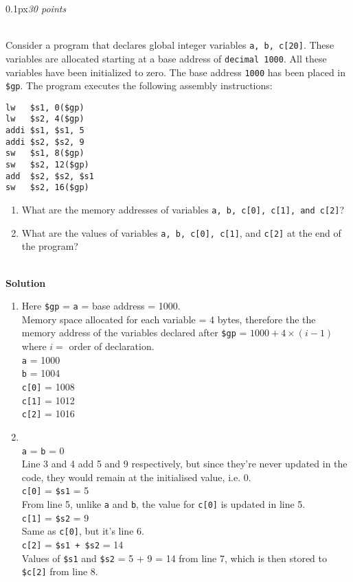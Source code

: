 \documentclass[11pt]{article}
\newcommand{\problem}[2]{\begin{adjustwidth}{0.1px}\noindent \framebox[1.2\width]{\large Problem #1}\hfill \emph{#2} \end{adjustwidth} \bigskip\\}
\newcommand{\code}[1]{{\texttt{#1}}}
\begin{document}
\newpage
\problem{9}{30 points}
Consider a program that declares global integer variables \code{a, b, c[20]}. These variables are allocated starting at a base address of \code{decimal 1000}. All these variables have been initialized to zero. The base address \code{1000} has been placed in \code{\$gp}. The program executes the following assembly instructions:
\begin{lstlisting}[style=MIPS]
lw   $s1, 0($gp)
lw   $s2, 4($gp)
addi $s1, $s1, 5
addi $s2, $s2, 9
sw   $s1, 8($gp)
sw   $s2, 12($gp)
add  $s2, $s2, $s1
sw   $s2, 16($gp)
\end{lstlisting}
\begin{enumerate}[label=(\alph*)]
	\item What are the memory addresses of variables \code{a, b, c[0], c[1], and c[2]}?
	\item What are the values of variables \code{a, b, c[0], c[1]}, and \code{c[2]} at the end of the program?
\end{enumerate}

\bigskip \\
\textbf{Solution}
\begin{enumerate}[label=(\alph*)]
	\item Here \code{\$gp} = \code{a} = base address = 1000.\\
	      Memory space allocated for each variable = 4 bytes, therefore the the memory address of the variables declared after \code{\$gp} = $1000 + 4 \times (i - 1)$ where $i = $ order of declaration.\bigskip
	      \\
	      \code{a} = 1000\\
	      \code{b} = 1004\\
	      \code{c[0]} = 1008\\
	      \code{c[1]} = 1012\\
	      \code{c[2]} = 1016

	\item \bigskip
	      \\
	      \code{a} = \code{b} = 0 \\
	      Line 3 and 4 add 5 and 9 respectively, but since they're never updated in the code, they would remain at the initialised value, i.e. 0.\medskip\\
	      \code{c[0]} = \code{\$s1} = 5\\
	      From line 5, unlike \code{a} and \code{b}, the value for \code{c[0]} is updated in line 5.\medskip\\
	      \code{c[1]} = \code{\$s2} = 9\\
	      Same as \code{c[0]}, but it's line 6.
	      \medskip\\
	      \code{c[2]} = \code{\$s1 + \$s2} = 14\\
	      Values of \code{\$s1} and \code{\$s2} = 5 + 9 = 14 from line 7, which is then stored to \code{\$c[2]} from line 8.


\end{enumerate}
\end{document}
